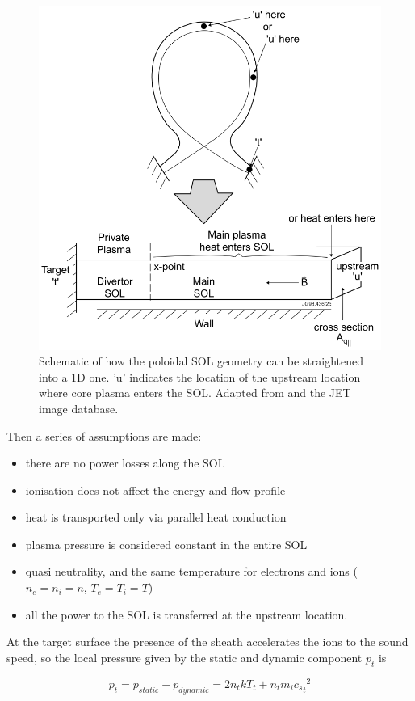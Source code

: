 \begin{figure}[!ht]
	\centering
	\includegraphics[trim={0 0 0 0},clip,width=0.65\linewidth]{Chapters/chapter1/figs/2PM.png}
	\caption{Schematic of how the poloidal SOL geometry can be straightened into a 1D one. 'u' indicates the location of the upstream location where core plasma enters the SOL.%
     Adapted from \cite{Harrison2011} and the JET image database.}
	\label{fig:2PM}
\end{figure}

Then a series of assumptions are made:
\begin{itemize}
    \item there are no power losses along the SOL%
    \item ionisation does not affect the energy and flow profile
    \item heat is transported only via parallel heat conduction
    \item plasma pressure is considered constant in the entire SOL
    \item quasi neutrality, and the same temperature for electrons and ions ($n_e = n_i = n$, $T_e = T_i = T$)
    \item all the power to the SOL is transferred at the upstream location.
\end{itemize}

At the target surface the presence of the sheath accelerates the ions to the sound speed, so the local pressure given by the static and dynamic component $p_t$ is

\begin{equation}
p_{t} = p_{static} + p_{dynamic} = 2n_{t} k T_{t} + n_{t} m_i {{c_s}_t}^2
\label{eq:2pm1}
\end{equation}

